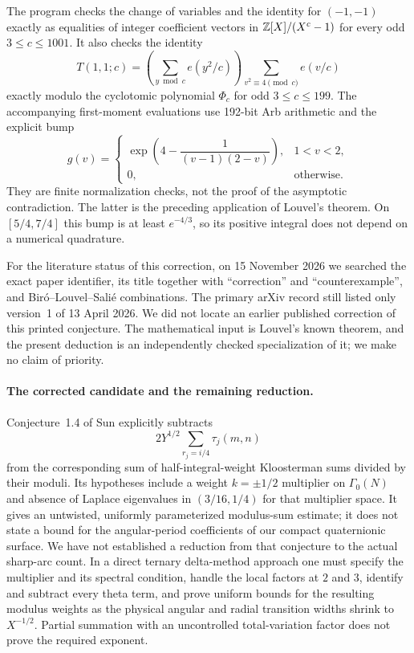 The program  checks the change of
variables and the identity for $(-1,-1)$ exactly as equalities of integer coefficient vectors in
$\mathbb Z[X]/(X^c-1)$ for every odd $3\leq c\leq1001$.
It also checks the identity
\[
 T(1,1;c)=
 \left(\sum_{y\bmod c}e(y^2/c)\right)
 \sum_{v^2\equiv4\pmod c}e(v/c)
\]
exactly modulo the cyclotomic polynomial $\Phi_c$ for odd
$3\leq c\leq199$.
The accompanying first-moment evaluations use 192-bit Arb arithmetic
and the explicit bump
\[
 g(v)=\begin{cases}
 \exp\!\left(4-\dfrac1{(v-1)(2-v)}\right),&1<v<2,\\
 0,&\text{otherwise}.
 \end{cases}
\]
They are finite normalization checks, not the proof of the asymptotic
contradiction.  The latter is the preceding application of Louvel's
theorem.  On $[5/4,7/4]$ this bump is at least $e^{-4/3}$, so its
positive integral does not depend on a numerical quadrature.

For the literature status of this correction, on 15 November 2026 we
searched the exact paper identifier, its title together with
``correction'' and ``counterexample'', and Bir\'o--Louvel--Sali\'e
combinations.  The primary arXiv record still listed only version~1
of 13 April 2026.  We did not locate an earlier published correction
of this printed conjecture.  The mathematical input is Louvel's known
theorem, and the present deduction is an independently checked
specialization of it; we make no claim of priority.

\paragraph{The corrected candidate and the remaining reduction.}
Conjecture~1.4 of Sun \cite{A5Sun2025} explicitly subtracts
\[
 2Y^{1/2}\sum_{r_j=i/4}\tau_j(m,n)
\]
from the corresponding sum of half-integral-weight Kloosterman
sums divided by their moduli.  Its hypotheses include a weight
$k=\pm1/2$ multiplier on $\Gamma_0(N)$ and absence of Laplace
eigenvalues in $(3/16,1/4)$ for that multiplier space.
It gives an untwisted, uniformly parameterized modulus-sum estimate;
it does not state a bound for the angular-period coefficients of
our compact quaternionic surface.
We have not established a reduction from that conjecture to the
actual sharp-arc count.  In a direct ternary delta-method approach
one must specify the multiplier and its spectral condition, handle
the local factors at $2$ and $3$, identify and subtract every theta
term, and prove uniform bounds for the resulting modulus weights
as the physical angular and radial transition widths shrink to
$X^{-1/2}$.  Partial summation with an uncontrolled total-variation
factor does not prove the required exponent.
